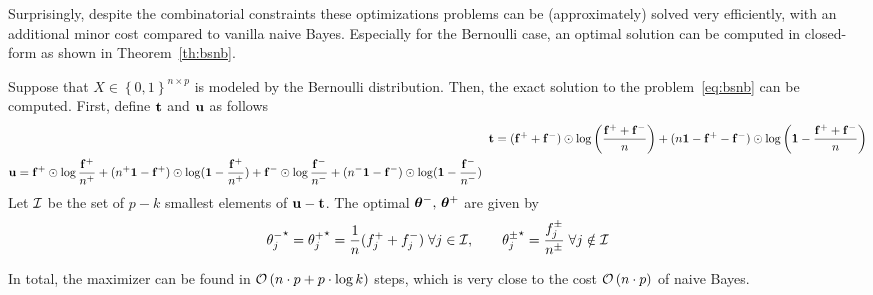 Surprisingly, despite the combinatorial constraints
these optimizations problems can be (approximately) solved very efficiently,
with an additional minor cost compared to vanilla naive Bayes.
Especially for the Bernoulli case,
an optimal solution can be computed in closed-form as shown in Theorem~\ref{th:bsnb}.
\begin{theorem}\label{th:bsnb}
Suppose that $X \in \left\{ 0, 1 \right\}^{n \times p}$ is modeled by the Bernoulli distribution.
Then, the exact solution to the problem~\ref{eq:bsnb} can be computed.
First, define $\mathbf{t}$ and $\mathbf{u}$ as follows
\begin{align*}
    \mathbf{t} &= (\mathbf{f}^+ + \mathbf{f}^-) \odot \log\left( \frac{\mathbf{f}^+ + \mathbf{f}^-}{n} \right)
    + (n\mathbf{1} - \mathbf{f}^+ - \mathbf{f}^-) \odot \log\left( \mathbf{1} - \frac{\mathbf{f}^+ + \mathbf{f}^-}{n} \right)\\
    \begin{split}
        \mathbf{u} &= \mathbf{f}^+ \odot \log \frac{\mathbf{f}^+}{n^+} + (n^+\mathbf{1} - \mathbf{f}^+) \odot \log (\mathbf{1} - \frac{\mathbf{f}^+}{n^+})
        + \mathbf{f}^- \odot \log \frac{\mathbf{f}^-}{n^-} + (n^-\mathbf{1} - \mathbf{f}^-) \odot \log (\mathbf{1} - \frac{\mathbf{f}^-}{n^-})
    \end{split}
\end{align*}
Let $\mathcal{I}$ be the set of $p - k$ smallest elements of $\mathbf{u} - \mathbf{t}$.
The optimal $\bm{\theta}^-,\, \bm{\theta}^+$ are given by
\begin{equation*}
    {\theta^-_j}^\star = {\theta^+_j}^\star = \frac{1}{n}(f_j^+ + f_j^-)
    \;\forall j \in \mathcal{I}
    ,\qquad
    {\theta^\pm_j}^\star = \frac{f^\pm_j}{n^\pm}
    \;\forall j \notin \mathcal{I}
\end{equation*}
\end{theorem}
In total, the maximizer can be found in $\mathcal{O}\left( n \cdot p + p \cdot \log k \right)$ steps,
which is very close to the cost $\mathcal{O}\left( n \cdot p \right)$ of naive Bayes.

